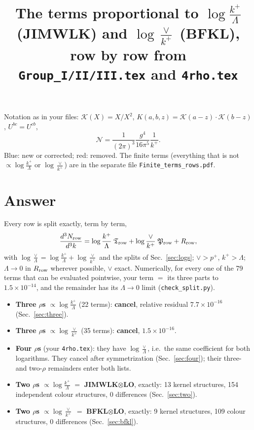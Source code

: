 \documentclass[10pt]{article}
\title{The terms proportional to $\log\frac{k^+}{\Lambda}$ (JIMWLK) and $\log\frac{\vee}{k^+}$ (BFKL),\\ row by row from \texttt{Group\_I/II/III.tex} and \texttt{4rho.tex}}
\date{}
\numberwithin{equation}{section}
\newcommand{\new}[1]{{\color{blue}#1}}
\newcommand{\old}[1]{{\color{red}#1}}
\begin{document}
\maketitle
\noindent Notation as in your files: $\mathcal K(X)=X/X^2$, $K(a,b,z)=\mathcal K(a-z)\cdot\mathcal K(b-z)$, $U^{bc}=U^{cb}$,
\begin{equation*}
\mathcal N=\frac{1}{(2\pi)^3}\frac{g^4}{16\pi^5}\frac{1}{k^+}.
\end{equation*}
\new{Blue}: new or corrected; \old{red}: removed. The finite terms (everything that is not $\propto\log\frac{k^+}{\Lambda}$ or $\log\frac{\vee}{k^+}$) are in the separate file \texttt{Finite\_terms\_rows.pdf}.

\section{Answer}\label{sec:answer}
Every row is split exactly, term by term,
\begin{equation}
\frac{d^3N_{\rm row}}{d^3k}=\log\frac{k^+}{\Lambda}\;\mathfrak T_{\rm row}+\log\frac{\vee}{k^+}\;\mathfrak P_{\rm row}+R_{\rm row},
\label{eq:split}
\end{equation}
with $\log\frac{\vee}{\Lambda}=\log\frac{k^+}{\Lambda}+\log\frac{\vee}{k^+}$ and the splits of Sec.~\ref{sec:logs}; $\vee>p^+$, $k^+>\Lambda$; $\Lambda\to0$ in $R_{\rm row}$ wherever possible, $\vee$ exact. Numerically, for every one of the 79 terms that can be evaluated pointwise, your term $=$ its three parts to $1.5\times10^{-14}$, and the remainder has its $\Lambda\to0$ limit (\texttt{check\_split.py}).
\begin{itemize}
\item \textbf{Three $\rho$\textquotesingle s $\propto\log\frac{k^+}{\Lambda}$} (22 terms): \textbf{cancel}, relative residual $7.7\times10^{-16}$ (Sec.~\ref{sec:three}).
\item \textbf{Three $\rho$\textquotesingle s $\propto\log\frac{\vee}{k^+}$} (35 terms): \textbf{cancel}, $1.5\times10^{-16}$.
\item \textbf{Four $\rho$\textquotesingle s} (your \texttt{4rho.tex}): they have $\log\frac{\vee}{\Lambda}$, i.e.\ the same coefficient for both logarithms. They cancel after symmetrization (Sec.~\ref{sec:four}); their three- and two-$\rho$ remainders enter both lists.
\item \textbf{Two $\rho$\textquotesingle s $\propto\log\frac{k^+}{\Lambda}$} $=$ \textbf{JIMWLK$\otimes$LO}, exactly: 13 kernel structures, 154 independent colour structures, 0 differences (Sec.~\ref{sec:two}).
\item \textbf{Two $\rho$\textquotesingle s $\propto\log\frac{\vee}{k^+}$} $=$ \textbf{BFKL$\otimes$LO}, exactly: 9 kernel structures, 109 colour structures, 0 differences (Sec.~\ref{sec:bfkl}).
\end{itemize}
\end{document}
